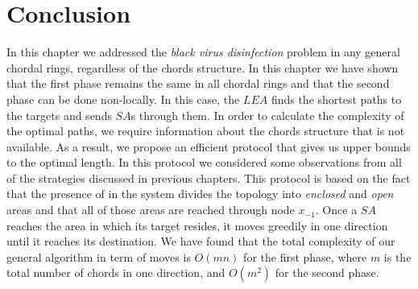 %
%
%
%
%
%
%
%
%
%
% 


\section{Conclusion}
In this chapter we addressed the {\it black virus disinfection} problem in any general chordal rings, regardless of the chords structure. In this chapter we have shown that the first phase remains the same in all chordal rings and that the second phase can be done non-locally. In this case, the $LEA$ finds the shortest paths to the targets and sends $SA$s through them. In order to calculate the complexity of the optimal paths, we require information about the chords structure that is not available. As a result, we propose an efficient protocol that gives us upper bounds to the optimal length. In this protocol we considered some observations from all of the strategies discussed in previous chapters. This protocol is based on the fact that the presence of  \bvs in the system divides the topology into {\em enclosed} and {\em open} areas and that all of those areas are reached through node $x_{-1}$. Once a $SA$ reaches the area in which its target resides, it moves greedily in one direction until it reaches its destination. 
We have found that the total complexity of our general algorithm  in  term of moves is $O(mn)$ for the first phase, where $m$ is the total number of chords in one direction, and $O( {m^2} )$ for the second phase.

%




